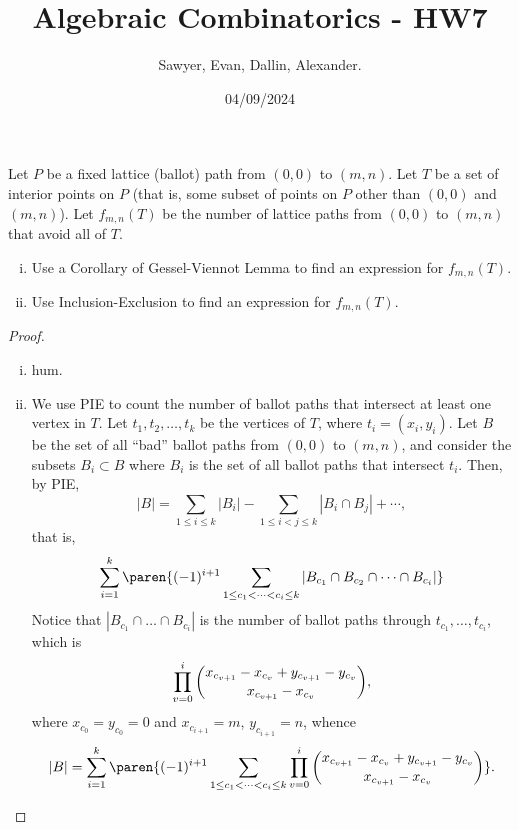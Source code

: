 \documentclass[letterpaper]{article}
\title{Algebraic Combinatorics - HW7}
\author{Sawyer, Evan, Dallin, Alexander.}
\date{04/09/2024}
\begin{document}
\maketitle
\begin{quest}[\textcolor{red}{Lattice Paths avoiding a certain set of points}]
Let $P$ be a fixed lattice (ballot) path from $(0,0)$ to $(m,n)$. Let $T$ be a set of interior points on $P$ (that is, some subset of points on $P$ other than $(0,0)$ and $(m,n)$). Let $f_{m,n}(T)$ be the number of lattice paths from $(0,0)$ to $(m,n)$ that avoid all of $T$.
\begin{enumerate}[(i)]
    \item Use a Corollary of Gessel-Viennot Lemma to find an expression for $f_{m,n}(T)$.
    \item Use Inclusion-Exclusion to find an expression for $f_{m,n}(T)$.
\end{enumerate}
\end{quest} 
\begin{proof}
\begin{enumerate}[(i)]
    \item hum.
    \item We use PIE to count the number of ballot paths that intersect at least one vertex in $T$. Let $t_1,t_2,\dots,t_k$ be the vertices of $T$, where $t_i=(x_i,y_i)$. Let $B$ be the set of all ``bad'' ballot paths from $(0,0)$ to $(m,n)$, and consider the subsets $B_i\subset B$ where $B_i$ is the set of all ballot paths that intersect $t_i$. Then, by PIE, \[|B|=\sum_{1\leq i\leq k}|B_i|-\sum_{1\leq i<j\leq k}|B_i\cap B_j|+\cdots,\] that is, \[\sum_{i=1}^k\paren{(-1)^{i+1}\sum_{1\leq c_1<\cdots<c_i\leq k}|B_{c_1}\cap B_{c_2}\cap\cdots\cap B_{c_i}|}\]
    Notice that $|B_{c_1}\cap \dots \cap B_{c_i}|$ is the number of ballot paths through $t_{c_1},\dots,t_{c_i}$, which is \[\prod_{v=0}^i\dbinom{x_{c_{v+1}}-x_{c_v}+y_{c_{v+1}}-y_{c_v}}{x_{c_{v+1}}-x_{c_v}},\] where $x_{c_0}=y_{c_0}=0$ and $x_{c_{i+1}}=m$, $y_{c_{i+1}}=n$, whence 
    \[|B|=\sum_{i=1}^k\paren{(-1)^{i+1}\sum_{1\leq c_1<\cdots<c_i\leq k}\prod_{v=0}^i\dbinom{x_{c_{v+1}}-x_{c_v}+y_{c_{v+1}}-y_{c_v}}{x_{c_{v+1}}-x_{c_v}}}.\]
    \end{enumerate}
\end{proof}
\end{document}
